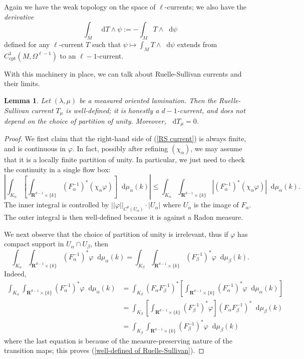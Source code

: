 \documentclass[reqno,11pt]{amsart}
\newcommand{\RR}{\mathbf{R}}
\newcommand*\dif{\mathop{}\!\mathrm{d}}
\newcommand{\dfn}[1]{\emph{#1}\index{#1}}
\newcommand{\cpt}{\mathrm{cpt}}
\newtheorem{lemma}[theorem]{Lemma}
\theoremstyle{definition}
\numberwithin{equation}{section}
\begin{document}
Again we have the weak topology on the space of $\ell$-currents; we also have the \dfn{derivative}
$$\int_M \dif T \wedge \psi := -\int_M T \wedge \dif \psi$$
defined for any $\ell$-current $T$ such that $\psi \mapsto \int_M T \wedge \dif \psi$ extends from $C^1_\cpt(M, \Omega^{\ell - 1})$ to an $\ell - 1$-current.

With this machinery in place, we can talk about Ruelle-Sullivan currents and their limits.

\begin{lemma}
Let $(\lambda, \mu)$ be a measured oriented lamination.
Then the Ruelle-Sullivan current $T_\mu$ is well-defined; it is honestly a $d-1$-current, and does not depend on the choice of partition of unity.
Moreover, $\dif T_\mu = 0$.
\end{lemma}
\begin{proof}
We first claim that the right-hand side of (\ref{RS current}) is always finite, and is continuous in $\varphi$.
In fact, possibly after refining $(\chi_\alpha)$, we may assume that it is a locally finite partition of unity.
In particular, we just need to check the continuity in a single flow box:
$$\left|\int_{K_\alpha} \left[\int_{\RR^{d - 1} \times \{k\}} (F_\alpha^{-1})^* (\chi_\alpha \varphi) \right] \dif \mu_\alpha(k)\right| \leq \int_{K_\alpha} \int_{\RR^{d - 1} \times \{k\}} |(F_\alpha^{-1})^* (\chi_\alpha \varphi)| \dif \mu_\alpha(k).$$
The inner integral is controlled by $||\varphi||_{C^0(U_\alpha)} \cdot |U_\alpha|$ where $U_\alpha$ is the image of $F_\alpha$.
The outer integral is then well-defined because it is against a Radon measure.

We next observe that the choice of partition of unity is irrelevant, thus if $\varphi$ has compact support in $U_\alpha \cap U_\beta$, then
\begin{equation}\label{well-defined of Ruelle-Sullivan}
\int_{K_\alpha} \int_{\RR^{d - 1} \times \{k\}} (F_\alpha^{-1})^* \varphi \dif \mu_\alpha(k) = \int_{K_\beta} \int_{\RR^{d - 1} \times \{k\}} (F_\beta^{-1})^* \varphi \dif \mu_\beta(k).
\end{equation}
Indeed,
\begin{align*}
\int_{K_\alpha} \int_{\RR^{d - 1} \times \{k\}} (F_\alpha^{-1})^* \varphi \dif \mu_\alpha(k)
&= \int_{K_\beta} (F_\alpha F_\beta^{-1})^* \left[\int_{\RR^{d - 1} \times \{k\}} (F_\alpha^{-1})^* \varphi \dif \mu_\alpha(k)\right] \\
&= \int_{K_\beta} \left[\int_{\RR^{d - 1} \times \{k\}} (F_\beta^{-1})^* \varphi\right] (F_\alpha F_\beta^{-1})^* \dif \mu_\beta(k) \\
&= \int_{K_\beta} \int_{\RR^{d - 1} \times \{k\}} (F_\beta^{-1})^* \varphi \dif \mu_\beta(k)
\end{align*}
where the last equation is because of the measure-preserving nature of the transition maps; this proves (\ref{well-defined of Ruelle-Sullivan}).


\end{proof}
\end{document}
